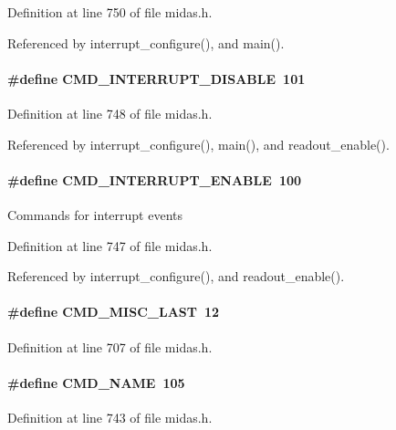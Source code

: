 Definition at line 750 of file midas.h.

Referenced by interrupt\_\-configure(), and main().
\paragraph[{CMD\_\-INTERRUPT\_\-DISABLE}]{\setlength{\rightskip}{0pt plus 5cm}\#define CMD\_\-INTERRUPT\_\-DISABLE~101}\hfill\label{group__err26_gaa12884ae2e3cbffa489d7c5074a029f7}


Definition at line 748 of file midas.h.

Referenced by interrupt\_\-configure(), main(), and readout\_\-enable().
\paragraph[{CMD\_\-INTERRUPT\_\-ENABLE}]{\setlength{\rightskip}{0pt plus 5cm}\#define CMD\_\-INTERRUPT\_\-ENABLE~100}\hfill\label{group__err26_gaab5043b2fd69a86d3bcecfb3fd8f7af3}
Commands for interrupt events 

Definition at line 747 of file midas.h.

Referenced by interrupt\_\-configure(), and readout\_\-enable().
\paragraph[{CMD\_\-MISC\_\-LAST}]{\setlength{\rightskip}{0pt plus 5cm}\#define CMD\_\-MISC\_\-LAST~12}\hfill\label{group__err26_gac7d08e7bebc772f1d095462ef0444172}


Definition at line 707 of file midas.h.
\paragraph[{CMD\_\-NAME}]{\setlength{\rightskip}{0pt plus 5cm}\#define CMD\_\-NAME~105}\hfill\label{group__err26_ga14a4025c458211f2dda999c7f99c656a}


Definition at line 743 of file midas.h.
